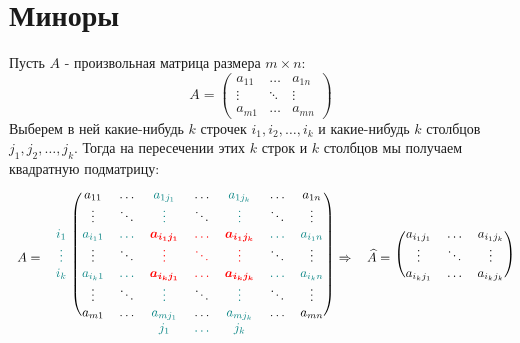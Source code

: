 \documentclass[12pt]{article}
\theoremstyle{definition}
\newcommand{\wht}[1]{\widehat{#1}}
\begin{document}
\section*{Миноры}
Пусть $A$ - произвольная матрица размера $m \times n$:
$$
	A = \begin{pmatrix}
		a_{11} & \dotsc  &a_{1n}\\
		\vdots & \ddots & \vdots \\
		a_{m1} & \dotsc & a_{mn}
	\end{pmatrix}
$$
Выберем в ней какие-нибудь $k$ строчек $i_1, i_2,\dotsc,i_k$ и какие-нибудь $k$ столбцов $j_1, j_2, \dotsc, j_k$. Тогда на пересечении этих $k$ строк и $k$ столбцов мы получаем квадратную подматрицу:
$$
	\begin{blockarray}{ccccccccc }
		\begin{block}{cc(ccccccc)}
			&& a_{11} & \dotsc & \color{teal}a_{1j_1} & \dotsc & \color{teal}a_{1j_k} & \dotsc & a_{1n} \\
			&& \vdots & \ddots & \color{teal}\vdots & \ddots & \color{teal}\vdots & \ddots & \vdots\\
		 &{\color{teal}i_1}& {\color{teal}a_{i_11}} & {\color{teal}\dotsc} & {\color{red}\boldsymbol{a_{i_1j_1}}} & {\color{red}\dotsc} & \boldsymbol{\color{red}a_{i_1j_k}} & {\color{teal}\dotsc} &{\color{teal}a_{i_1n}}\\
	 	 A = &{\color{teal}\vdots}	& \vdots & \ddots & {\color{red}\vdots} & \color{red}{\ddots} & \color{red}{\vdots} & \ddots & \vdots\\
	 	 &\color{teal}i_k& {\color{teal}a_{i_k1}} & {\color{teal}\dotsc} & \boldsymbol{\color{red}a_{i_kj_1}} & {\color{red}\dotsc} & \boldsymbol{\color{red}a_{i_kj_k}} & \color{teal}\dotsc &\color{teal}a_{i_kn}\\
	 	 	&& \vdots & \ddots & \color{teal}\vdots & \ddots & \color{teal}\vdots & \ddots & \vdots\\
 	 		&& a_{m1} & \dotsc & \color{teal}a_{mj_1} & \dotsc & \color{teal}a_{mj_k} & \dotsc & a_{mn}\\
		\end{block}
		&	&  &  & \color{teal}j_1 & \color{teal}\dotsc & \color{teal}j_k & & 
	\end{blockarray}
	\begin{blockarray}{ccccc}
		& & & &  \\
		& & & &  \\
		\begin{block}{cc(ccc)}
			& & a_{i_1 j_1} & \dotsc & a_{i_1 j_k} \\
			\Rightarrow & \wht{A} =  & \vdots & \ddots & \vdots \\
			& & a_{i_k j_1} & \dotsc & a_{i_k j_k}\\  
		\end{block}
		& & & &  \\
		& & & &  \\
		& & & &  
	\end{blockarray}
$$
\end{document}
